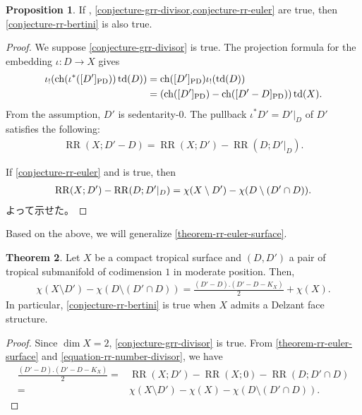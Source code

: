 \documentclass[a4paper,dvipdfmx,reqno,12pt]{amsart}
\theoremstyle{definition}
\newtheorem{theorem}{Theorem}[section]
\newtheorem{proposition}[theorem]{Proposition}
\newcommand{\opn}[1]{\operatorname{#1}}
\newcommand{\PD}[1]{[#1]_{\mathrm{PD}}}
\numberwithin{equation}{section}
\begin{document}
\begin{proposition}
If \label{proposition-euler-to-bertini}
\cite[Conjecture 6.13]{demedrano2023chern},
\cref{conjecture-grr-divisor,conjecture-rr-euler}
are true, then \cref{conjecture-rr-bertini} is also true. 
\end{proposition}

\begin{proof}
We suppose \cref{conjecture-grr-divisor} is true.
The projection formula for 
the embedding $\iota\colon D\to X$ gives
\begin{align}
\iota_!(\opn{ch}(\iota^{*}(\PD{D'}))\opn{td}(D))
&=\opn{ch}(\PD{D'})\iota_!(\opn{td}(D)) \notag \\
&=(\opn{ch}(\PD{D'})-\opn{ch}(\PD{D'-D}))\opn{td}(X).
\end{align}
From the assumption, 
$D'$ is sedentarity-$0$. 
The pullback $\iota^{*}D'=D'|_{D}$ of $D'$ satisfies
the following:
\begin{align}
\label{equation-rr-number-divisor}
\opn{RR}(X;D'-D)=\opn{RR}(X;D')-
\opn{RR}(D;D'|_{D}).
\end{align}

If \cref{conjecture-rr-euler} and 
\cite[Conjecture 6.13]{demedrano2023chern} is true,
then
\begin{align}
\opn{RR}(X;D')-
\opn{RR}(D;D'|_{D})=
\chi(X\setminus D')-\chi(D\setminus (D'\cap D)). \notag
\end{align}
よって示せた。
\end{proof}

Based on the above, we will generalize
\cref{theorem-rr-euler-surface}.

\begin{theorem}
\label{theorem-rr-bertini-surface}
Let $X$ be a compact tropical surface
and $(D,D')$ a pair of tropical submanifold of
codimension $1$ in moderate position. Then,
\begin{align}
\chi(X\setminus D')-\chi(D\setminus (D'\cap D))
=\frac{(D'-D).(D'-D-K_X)}{2}+\chi(X).
\end{align}
In particular, \cref{conjecture-rr-bertini} is true 
when $X$ admits a Delzant face structure.
\end{theorem}

\begin{proof}
Since $\dim X=2$, 
\cref{conjecture-grr-divisor} is true.
From \cref{theorem-rr-euler-surface} and 
\eqref{equation-rr-number-divisor}, we have
\begin{align}
\frac{(D'-D).(D'-D-K_X)}{2}=&
\opn{RR}(X;D')-\opn{RR}(X;0)-
\opn{RR}(D;D'\cap D) \\
=&\chi(X\setminus D')-\chi(X)-\chi(D\setminus (D'\cap D)).
\end{align}
\end{proof}
\end{document}
